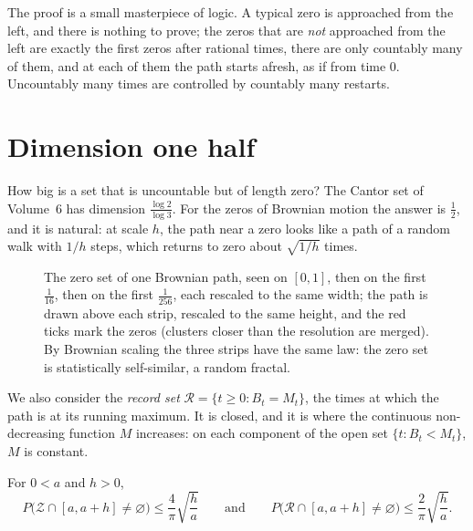 \begin{beauty}
The proof is a small masterpiece of logic. A typical zero is approached from the left, and there is nothing to prove; the zeros that are \emph{not} approached from the left are exactly the
first zeros after rational times, there are only countably many of them, and at each of them the path starts afresh, as if from time $0$. Uncountably many times are controlled by
countably many restarts.
\end{beauty}

\section{Dimension one half}

How big is a set that is uncountable but of length zero? The Cantor set of Volume~6 has dimension $\frac{\log2}{\log3}$. For the zeros of Brownian motion the answer is $\frac12$, and it is
natural: at scale $h$, the path near a zero looks like a path of a random walk with $1/h$ steps, which returns to zero about $\sqrt{1/h}$ times.

\begin{figure}[ht]
\centering
{}
\caption{The zero set of one Brownian path, seen on $[0,1]$, then on the first $\frac1{16}$, then on the first $\frac1{256}$, each rescaled to the same width; the path is drawn above each strip, rescaled to the same height, and the red ticks mark the zeros (clusters closer than the
resolution are merged). By Brownian scaling the three strips have the same law: the zero set is statistically self-similar, a random fractal.}
\label{fig:zeros}
\end{figure}

We also consider the \emph{record set} $\mathcal R=\{t\ge0:B_t=M_t\}$, the times at which the path is at its running maximum. It is closed, and it is where the continuous non-decreasing function $M$
increases: on each component of the open set $\{t:B_t<M_t\}$, $M$ is constant.

\begin{lemma}\label{lem:hitprob}
For $0<a$ and $h>0$,
\[
P\bigl(\mathcal Z\cap[a,a+h]\neq\varnothing\bigr)\le\frac4\pi\sqrt{\frac ha}\qquad\text{and}\qquad P\bigl(\mathcal R\cap[a,a+h]\neq\varnothing\bigr)\le\frac2\pi\sqrt{\frac ha}.
\]
\end{lemma}

